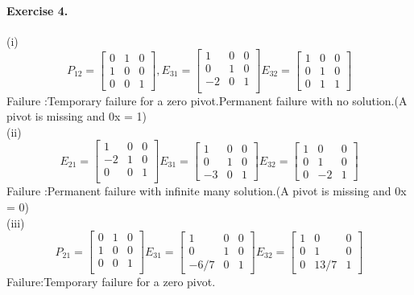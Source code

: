 \documentclass{article}
\begin{document}
\paragraph{Exercise 4.}
(i) \[
P_{12}=\begin{bmatrix}
    0 & 1 & 0\\
    1 & 0 & 0\\
    0 & 0 & 1
\end{bmatrix},
E_{31}=\begin{bmatrix}
    1 & 0 & 0\\
    0 & 1 & 0\\
    -2 & 0 & 1 \\
\end{bmatrix}
E_{32}=\begin{bmatrix}
    1 & 0 & 0\\
    0 & 1 & 0\\
    0 & 1 & 1
\end{bmatrix}
\]
Failure :Temporary failure for a zero pivot.Permanent failure with no solution.(A pivot is missing and 0x = 1)\\
(ii) \[
    E_{21}=\begin{bmatrix}
        1 & 0 & 0\\
        -2 & 1 & 0\\
        0 & 0 & 1 \\
    \end{bmatrix}
    E_{31}=\begin{bmatrix}
        1 & 0 & 0\\
        0 & 1 & 0\\
        -3 & 0 & 1
    \end{bmatrix}
    E_{32}=\begin{bmatrix}
        1 & 0 & 0\\
        0 & 1 & 0\\
        0 & -2 & 1
    \end{bmatrix}
    \]
Failure :Permanent failure with infinite many solution.(A pivot is missing and 0x = 0)\\
(iii)\[
    P_{21}=\begin{bmatrix}
        0 & 1 & 0\\
        1 & 0 & 0\\
        0 & 0 & 1 \\
    \end{bmatrix}
    E_{31}=\begin{bmatrix}
        1 & 0 & 0\\
        0 & 1 & 0\\
        -6/7 & 0 & 1  
    \end{bmatrix}
    E_{32}=\begin{bmatrix}
        1 & 0 & 0\\
        0 & 1 & 0\\
        0 & 13/7 & 1
    \end{bmatrix}
\]Failure:Temporary failure for a zero pivot.
\end{document}
